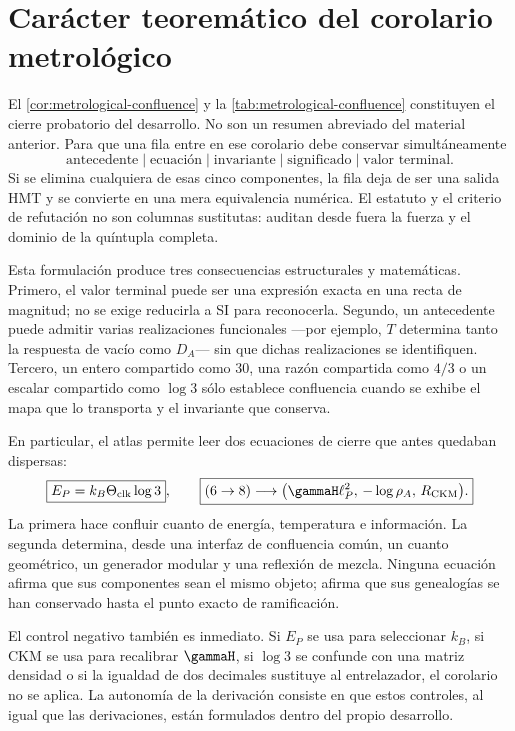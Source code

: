 \section{Car\'acter teorem\'atico del corolario metrol\'ogico}

El \cref{cor:metrological-confluence} y la
\cref{tab:metrological-confluence} constituyen el cierre probatorio del
desarrollo. No son un resumen abreviado del material anterior. Para que una fila
entre en ese corolario debe conservar simult\'aneamente
\[
\text{antecedente}\mid\text{ecuaci\'on}\mid\text{invariante}
\mid\text{significado}\mid\text{valor terminal}.
\]
Si se elimina cualquiera de esas cinco componentes, la fila deja de ser una
salida HMT y se convierte en una mera equivalencia num\'erica. El estatuto y
el criterio de refutación no son columnas sustitutas: auditan desde fuera la fuerza y el
dominio de la qu\'intupla completa.

Esta formulaci\'on produce tres consecuencias estructurales y matemáticas.
Primero, el valor terminal puede ser una expresi\'on exacta en una recta de
magnitud; no se exige reducirla a SI para reconocerla. Segundo, un antecedente
puede admitir varias realizaciones funcionales ---por ejemplo, \(T\)
determina tanto la respuesta de vac\'io como \(D_A\)--- sin que dichas
realizaciones se identifiquen.
Tercero, un entero compartido como \(30\), una raz\'on compartida como \(4/3\)
o un escalar compartido como \(\log3\) s\'olo establece confluencia cuando se
exhibe el mapa que lo transporta y el invariante que conserva.

En particular, el atlas permite leer dos ecuaciones de cierre que antes
quedaban dispersas:
\begin{equation}
\boxed{E_P=k_B\Theta_{\rm clk}\log3},
\qquad
\boxed{
(6\to8)\longrightarrow
\bigl(\gammaH\ell_P^2,\,-\log\rho_A,\,R_{\rm CKM}\bigr).}
\label{eq:status-two-confluences}
\end{equation}
La primera hace confluir cuanto de energ\'ia, temperatura e informaci\'on. La
segunda determina, desde una interfaz de confluencia com\'un, un cuanto
geom\'etrico, un generador
modular y una reflexi\'on de mezcla. Ninguna ecuaci\'on afirma que sus
componentes sean el mismo objeto; afirma que sus genealog\'ias se han
conservado hasta el punto exacto de ramificaci\'on.

El control negativo tambi\'en es inmediato. Si \(E_P\) se usa para seleccionar
\(k_B\), si CKM se usa para recalibrar \(\gammaH\), si \(\log3\) se confunde
con una matriz densidad o si la igualdad de dos decimales sustituye al
entrelazador, el corolario no se aplica. La autonomía de la derivación consiste en
que estos controles, al igual que las derivaciones, est\'an formulados dentro
del propio desarrollo.

